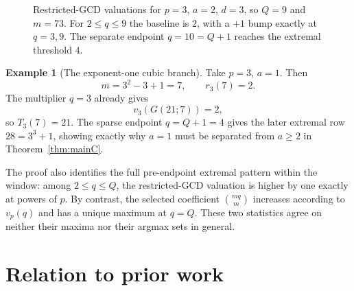 \documentclass[11pt]{article}
\theoremstyle{definition}
\newtheorem{example}[theorem]{Example}
\theoremstyle{remark}
\begin{document}
\begin{figure}[tbp]
\centering
{}
\caption{Restricted-GCD valuations for \(p=3\), \(a=2\), \(d=3\),
so \(Q=9\) and \(m=73\).  For \(2\le q\le9\) the baseline is \(2\),
with a \(+1\) bump exactly at \(q=3,9\).  The separate endpoint
\(q=10=Q+1\) reaches the extremal threshold \(4\).}
\label{fig:valuation-profile}
\end{figure}

\begin{example}[The exponent-one cubic branch]
Take \(p=3\), \(a=1\).  Then
\[
  m=3^2-3+1=7,\qquad r_3(7)=2.
\]
The multiplier \(q=3\) already gives
\[
  v_3(G(21;7))=2,
\]
so \(T_3(7)=21\).  The sparse endpoint \(q=Q+1=4\) gives the later extremal
row \(28=3^3+1\), showing exactly why \(a=1\) must be separated from
\(a\ge2\) in Theorem~\ref{thm:mainC}.
\end{example}

The proof also identifies the full pre-endpoint extremal pattern within the
window: among \(2\le q\le Q\), the restricted-GCD valuation is higher by one
exactly at powers of \(p\).  By contrast, the selected coefficient
\(\binom{mq}{m}\) increases according to \(v_p(q)\) and has a unique maximum
at \(q=Q\).  These two statistics agree on neither their maxima nor their
argmax sets in general.

\section{Relation to prior work}\label{sec:related}
\end{document}
